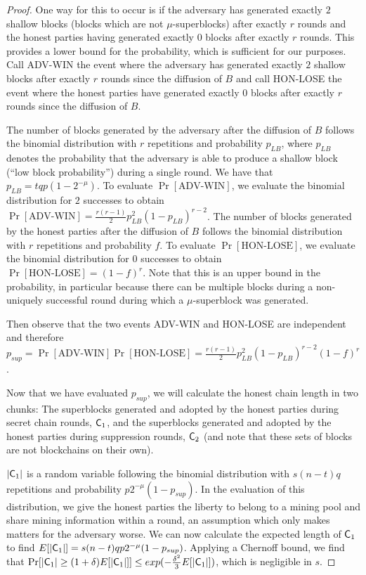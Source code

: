 \begin{proof}
One way for this to occur is if the adversary has generated exactly $2$ shallow
blocks (blocks which are not $\mu$-superblocks) after exactly $r$ rounds and the
honest parties having generated exactly $0$ blocks after exactly $r$ rounds.
This provides a lower bound for the probability, which is sufficient for our
purposes. Call ADV-WIN the event where the adversary has generated exactly $2$
shallow blocks after exactly $r$ rounds since the diffusion of $B$ and call
HON-LOSE the event where the honest parties have generated exactly $0$ blocks
after exactly $r$ rounds since the diffusion of $B$.

The number of blocks generated by the adversary after the diffusion of $B$
follows the binomial distribution with $r$ repetitions and probability $p_{LB}$,
where $p_{LB}$ denotes the probability that the adversary is able to produce a
shallow block (``low block probability'') during a single round. We have that
$p_{LB} = tqp(1 - 2^{-\mu})$. To evaluate $\Pr[\text{ADV-WIN}]$, we evaluate the
binomial distribution for $2$ successes to obtain $\Pr[\text{ADV-WIN}] =
\frac{r(r - 1)}{2} p_{LB}^2 (1 - p_{LB})^{r - 2}$. The number of blocks
generated by the honest parties after the diffusion of $B$ follows the binomial
distribution with $r$ repetitions and probability $f$. To evaluate
$\Pr[\text{HON-LOSE}]$, we evaluate the binomial distribution for $0$ successes
to obtain $\Pr[\text{HON-LOSE}] = (1 - f)^r$. Note that this is an upper bound
in the probability, in particular because there can be multiple
blocks during a non-uniquely successful round during which a $\mu$-superblock
was generated.

Then observe that the two events ADV-WIN and HON-LOSE are independent and
therefore
$p_{sup} =
 \Pr[\text{ADV-WIN}]\Pr[\text{HON-LOSE}] =\allowbreak
 \frac{r(r - 1)}{2} p_{LB}^2 (1 - p_{LB})^{r - 2}(1 - f)^r$.

Now that we have evaluated $p_{sup}$,  we will calculate the honest chain length
in two chunks: The superblocks generated and adopted by the honest parties
during secret chain rounds, $\mathsf{C}_1$, and the superblocks generated and
adopted by the honest parties during suppression rounds, $\mathsf{C}_2$ (and note
that these sets of blocks are not blockchains on their own).

$|\mathsf{C}_1|$ is a random variable following the binomial distribution with
$s(n - t)q$ repetitions and probability $p2^{-\mu}(1 - p_{sup})$. In the
evaluation of this distribution, we give the honest parties the liberty to
belong to a mining pool and share mining information within a round, an
assumption which only makes matters for the adversary worse. We can now
calculate the expected length of $\mathsf{C}_1$ to find
$E[|\mathsf{C}_1|] = s(n - t)qp2^{-\mu}(1 - p_{sup})$. Applying a Chernoff bound, we
find that
$\Pr[|\mathsf{C}_1| \geq (1 + \delta)E[|\mathsf{C}_1|]]
\leq exp(-\frac{\delta^2}{3}E[|\mathsf{C}_1|])$, which is negligible in $s$.


\end{proof}

